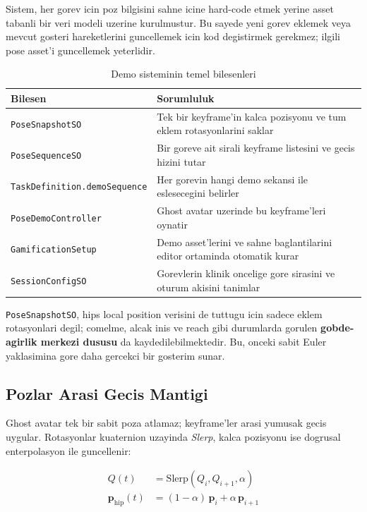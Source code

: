 \documentclass[11pt,a4paper]{article}
\begin{document}
Sistem, her gorev icin poz bilgisini sahne icine hard-code etmek yerine
asset tabanli bir veri modeli uzerine kurulmustur. Bu sayede yeni gorev
eklemek veya mevcut gosteri hareketlerini guncellemek icin kod degistirmek
gerekmez; ilgili pose asset'i guncellemek yeterlidir.

\begin{table}[H]
\centering
\caption{Demo sisteminin temel bilesenleri}
\label{tab:demo_bilesen}
\renewcommand{\arraystretch}{1.22}
\begin{tabularx}{\textwidth}{lX}
\toprule
\textbf{Bilesen} & \textbf{Sorumluluk} \\
\midrule
\texttt{PoseSnapshotSO} & Tek bir keyframe'in kalca pozisyonu ve tum eklem rotasyonlarini saklar \\
\texttt{PoseSequenceSO} & Bir goreve ait sirali keyframe listesini ve gecis hizini tutar \\
\texttt{TaskDefinition.demoSequence} & Her gorevin hangi demo sekansi ile eslesecegini belirler \\
\texttt{PoseDemoController} & Ghost avatar uzerinde bu keyframe'leri oynatir \\
\texttt{GamificationSetup} & Demo asset'lerini ve sahne baglantilarini editor ortaminda otomatik kurar \\
\texttt{SessionConfigSO} & Gorevlerin klinik oncelige gore sirasini ve oturum akisini tanimlar \\
\bottomrule
\end{tabularx}
\end{table}

\texttt{PoseSnapshotSO}, hips local position verisini de tuttugu icin sadece
eklem rotasyonlari degil; comelme, alcak inis ve reach gibi durumlarda
gorulen \textbf{gobde-agirlik merkezi dususu} da kaydedilebilmektedir.
Bu, onceki sabit Euler yaklasimina gore daha gercekci bir gosterim sunar.

\subsection{Pozlar Arasi Gecis Mantigi}

Ghost avatar tek bir sabit poza atlamaz; keyframe'ler arasi yumusak gecis
uygular. Rotasyonlar kuaternion uzayinda \textit{Slerp}, kalca pozisyonu ise
dogrusal enterpolasyon ile guncellenir:

\begin{align}
    Q(t) &= \mathrm{Slerp}(Q_i, Q_{i+1}, \alpha)
    \label{eq:slerp_demo} \\
    \mathbf{p}_{\text{hip}}(t) &= (1-\alpha)\,\mathbf{p}_i + \alpha\,\mathbf{p}_{i+1}
    \label{eq:lerp_demo}
\end{align}
\end{document}
